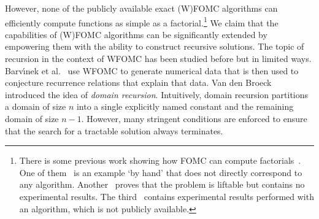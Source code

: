 \documentclass{article}
\theoremstyle{definition}
\begin{document}
However, none of the publicly available exact (W)FOMC algorithms can efficiently
compute functions as simple as a factorial.\footnote{There is some previous work
  showing how FOMC can compute
  factorials~\cite{DBLP:journals/jair/Kuzelka21,DBLP:conf/kr/BremenK21,DBLP:conf/ijcai/Broeck16}.
  One of them~\cite{DBLP:conf/ijcai/Broeck16} is an example `by hand' that does
  not directly correspond to any algorithm.
  Another~\cite{DBLP:journals/jair/Kuzelka21} proves that the problem is
  liftable but contains no experimental results. The
  third~\cite{DBLP:conf/kr/BremenK21} contains experimental results performed
  with an algorithm, which is not publicly available.} We claim that the
capabilities of (W)FOMC algorithms can be significantly extended by empowering
them with the ability to construct recursive solutions. The topic of recursion
in the context of WFOMC has been studied before but in limited ways.
Barv{\'{\i}}nek et al.~ use WFOMC to
generate numerical data that is then used to conjecture recurrence relations
that explain that data. Van den Broeck~
introduced the idea of \emph{domain recursion}. Intuitively, domain recursion
partitions a domain of size $n$ into a single explicitly named constant and the
remaining domain of size $n-1$. However, many stringent conditions are enforced
to ensure that the search for a tractable solution always terminates.


\end{document}
